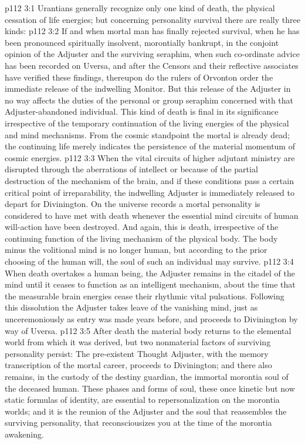 \vs p112 3:1 Urantians generally recognize only one kind of death, the physical cessation of life energies; but concerning personality survival there are really three kinds:
\vs p112 3:2 \bibnobreakspace {} If and when mortal man has finally rejected survival, when he has been pronounced spiritually insolvent, morontially bankrupt, in the conjoint opinion of the Adjuster and the surviving seraphim, when such co\hyp{}ordinate advice has been recorded on Uversa, and after the Censors and their reflective associates have verified these findings, thereupon do the rulers of Orvonton order the immediate release of the indwelling Monitor. But this release of the Adjuster in no way affects the duties of the personal or group seraphim concerned with that Adjuster\hyp{}abandoned individual. This kind of death is final in its significance irrespective of the temporary continuation of the living energies of the physical and mind mechanisms. From the cosmic standpoint the mortal is already dead; the continuing life merely indicates the persistence of the material momentum of cosmic energies.
\vs p112 3:3 \pc {}\bibnobreakspace {} When the vital circuits of higher adjutant ministry are disrupted through the aberrations of intellect or because of the partial destruction of the mechanism of the brain, and if these conditions pass a certain critical point of irreparability, the indwelling Adjuster is immediately released to depart for Divinington. On the universe records a mortal personality is considered to have met with death whenever the essential mind circuits of human will\hyp{}action have been destroyed. And again, this is death, irrespective of the continuing function of the living mechanism of the physical body. The body minus the volitional mind is no longer human, but according to the prior choosing of the human will, the soul of such an individual may survive.
\vs p112 3:4 \pc {}\bibnobreakspace {} When death overtakes a human being, the Adjuster remains in the citadel of the mind until it ceases to function as an intelligent mechanism, about the time that the measurable brain energies cease their rhythmic vital pulsations. Following this dissolution the Adjuster takes leave of the vanishing mind, just as unceremoniously as entry was made years before, and proceeds to Divinington by way of Uversa.
\vs p112 3:5 \pc After death the material body returns to the elemental world from which it was derived, but two nonmaterial factors of surviving personality persist: The pre\hyp{}existent Thought Adjuster, with the memory transcription of the mortal career, proceeds to Divinington; and there also remains, in the custody of the destiny guardian, the immortal morontia soul of the deceased human. These phases and forms of soul, these once kinetic but now static formulas of identity, are essential to repersonalization on the morontia worlds; and it is the reunion of the Adjuster and the soul that reassembles the surviving personality, that reconsciousizes you at the time of the morontia awakening.
